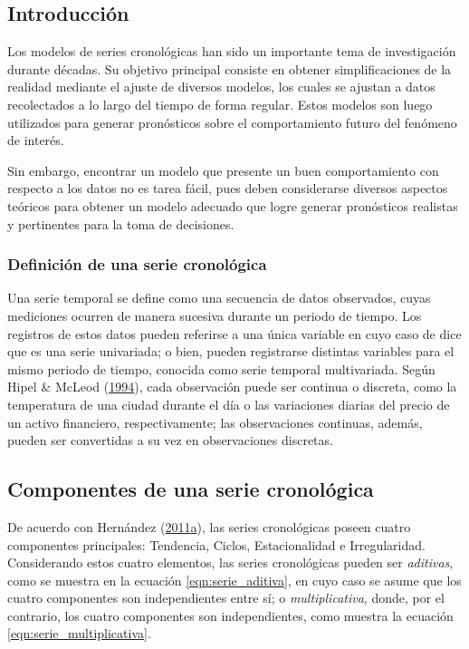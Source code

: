 \documentclass[
]{article}
\begin{document}
\subsection{Introducción}

Los modelos de series cronológicas han sido un importante tema de
investigación durante décadas. Su objetivo principal consiste en obtener
simplificaciones de la realidad mediante el ajuste de diversos modelos,
los cuales se ajustan a datos recolectados a lo largo del tiempo de
forma regular. Estos modelos son luego utilizados para generar
pronósticos sobre el comportamiento futuro del fenómeno de interés.

Sin embargo, encontrar un modelo que presente un buen comportamiento con
respecto a los datos no es tarea fácil, pues deben considerarse diversos
aspectos teóricos para obtener un modelo adecuado que logre generar
pronósticos realistas y pertinentes para la toma de decisiones.

\subsubsection{Definición de una serie cronológica}

Una serie temporal se define como una secuencia de datos observados,
cuyas mediciones ocurren de manera sucesiva durante un periodo de
tiempo. Los registros de estos datos pueden referirse a una única
variable en cuyo caso de dice que es una serie univariada; o bien,
pueden registrarse distintas variables para el mismo periodo de tiempo,
conocida como serie temporal multivariada. Según Hipel \& McLeod
(\protect\hyperlink{ref-Hipel}{1994}), cada observación puede ser
continua o discreta, como la temperatura de una ciudad durante el día o
las variaciones diarias del precio de un activo financiero,
respectivamente; las observaciones continuas, además, pueden ser
convertidas a su vez en observaciones discretas.

\subsection{Componentes de una serie cronológica}

De acuerdo con Hernández
(\protect\hyperlink{ref-oscarh-1}{2011}\protect\hyperlink{ref-oscarh-1}{a}),
las series cronológicas poseen cuatro componentes principales:
Tendencia, Ciclos, Estacionalidad e Irregularidad. Considerando estos
cuatro elementos, las series cronológicas pueden ser \emph{aditivas},
como se muestra en la ecuación \ref{eqn:serie_aditiva}, en cuyo caso se
asume que los cuatro componentes son independientes entre sí; o
\emph{multiplicativa}, donde, por el contrario, los cuatro componentes
son independientes, como muestra la ecuación
\ref{eqn:serie_multiplicativa}.
\end{document}
